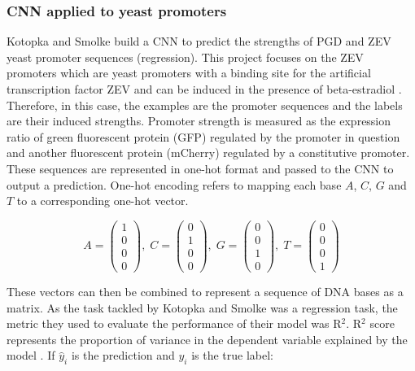 \documentclass{article}
\begin{document}
\subsubsection{CNN applied to yeast promoters}
Kotopka and Smolke \cite{smolke2020promoter} build a CNN to predict the strengths of PGD and ZEV yeast promoter sequences (regression). This project focuses on the ZEV promoters which are yeast promoters with a binding site for the artificial transcription factor ZEV and can be induced in the presence of beta-estradiol \cite{smolke2020promoter}. Therefore, in this case, the examples are the promoter sequences and the labels are their induced strengths. Promoter strength is measured as the expression ratio of green fluorescent protein (GFP) regulated by the promoter in question and another fluorescent protein (mCherry) regulated by a constitutive promoter. These sequences are represented in one-hot format and passed to the CNN to output a prediction. One-hot encoding refers to mapping each base $A$, $C$, $G$ and $T$ to a corresponding one-hot vector.

$$
    A = \begin{pmatrix}
        1 \\ 0 \\ 0 \\ 0
    \end{pmatrix}, \;
    C = \begin{pmatrix}
        0 \\ 1 \\ 0 \\ 0
    \end{pmatrix}, \;
    G = \begin{pmatrix}
        0 \\ 0 \\ 1 \\ 0
    \end{pmatrix}, \;
    T = \begin{pmatrix}
        0 \\ 0 \\ 0 \\ 1
    \end{pmatrix}
$$

These vectors can then be combined to represent a sequence of DNA bases as a matrix. As the task tackled by Kotopka and Smolke \cite{smolke2020promoter} was a regression task, the metric they used to evaluate the performance of their model was R$^2$. R$^2$ score represents the proportion of variance in the dependent variable explained by the model \cite{scikit-learn}. If $\hat{y}_i$ is the prediction and $y_i$ is the true label:
\end{document}
